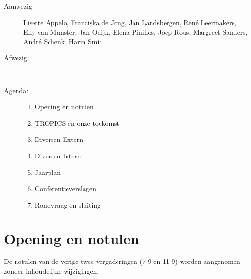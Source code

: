 

   \RosSupersedes{-}
   \MakeRosTitle
%
%
\begin{description}
\item[Aanwezig:] Lisette Appelo, Franciska de Jong, 
                 Jan Landsbergen, Ren\'{e} Leermakers, 
                 Elly van Munster, 
                 Jan Odijk, Elena Pinillos, Joep Rous, Margreet Sanders,
                 Andr\'{e} Schenk, Harm Smit
\item[Afwezig:]  ---
\item[Agenda:]\mbox{}
  \begin{enumerate}
  \item Opening en notulen
  \item TROPICS en onze toekomst
  \item Diversen Extern
  \item Diversen Intern
  \item Jaarplan
  \item Conferentieverslagen
  \item Rondvraag en sluiting
  \end{enumerate}
\end{description}

\section{Opening en notulen}
De notulen van de vorige twee vergaderingen (7-9 en 11-9) worden 
aangenomen zonder inhoudelijke wijzigingen.


